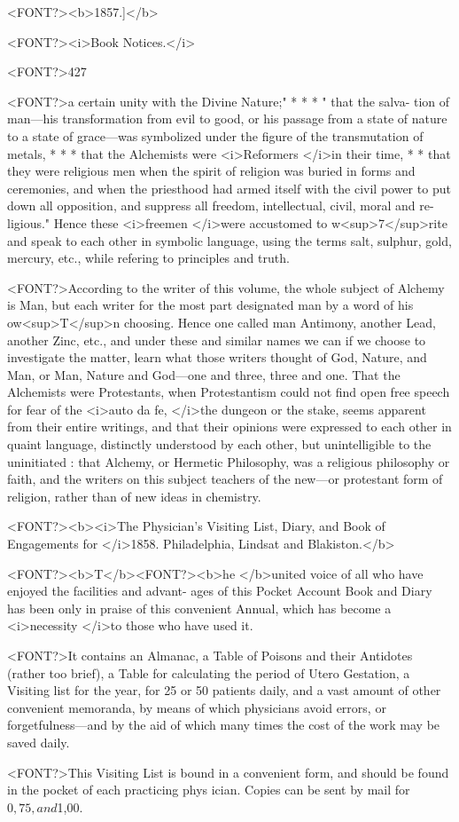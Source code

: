 <FONT?><b>1857.]</b>

<FONT?><i>Book Notices.</i>

<FONT?>427

<FONT?>a certain unity with the Divine Nature;" * * * " that the salva-
tion of man---his transformation from evil to good, or his passage from
a state of nature to a state of grace---was symbolized under the figure
of the transmutation of metals, * * * that the Alchemists were
<i>Reformers </i>in their time, * * that they were religious men when
the spirit of religion was buried in forms and ceremonies, and when
the priesthood had armed itself with the civil power to put down all
opposition, and suppress all freedom, intellectual, civil, moral and re-
ligious." Hence these <i>freemen </i>were accustomed to w<sup>7</sup>rite and speak
to each other in symbolic language, using the terms salt, sulphur, gold,
mercury, etc., while refering to principles and truth.

<FONT?>According to the writer of this volume, the whole subject of Alchemy
is Man, but each writer for the most part designated man by a word of
his ow<sup>T</sup>n choosing. Hence one called man Antimony, another Lead,
another Zinc, etc., and under these and similar names we can if we
choose to investigate the matter, learn what those writers thought of
God, Nature, and Man, or Man, Nature and God---one and three, three
and one. That the Alchemists were Protestants, when Protestantism
could not find open free speech for fear of the <i>auto da fe, </i>the dungeon
or the stake, seems apparent from their entire writings, and that their
opinions were expressed to each other in quaint language, distinctly
understood by each other, but unintelligible to the uninitiated : that
Alchemy, or Hermetic Philosophy, was a religious philosophy or faith,
and the writers on this subject teachers of the new---or protestant form
of religion, rather than of new ideas in chemistry.

<FONT?><b><i>The Physician's Visiting List, Diary, and Book of Engagements for </i>1858. Philadelphia,
Lindsat and Blakiston.</b>

<FONT?><b>T</b><FONT?><b>he </b>united voice of all who have enjoyed the facilities and advant-
ages of this Pocket Account Book and Diary has been only in praise
of this convenient Annual, which has become a <i>necessity </i>to those who
have used it.

<FONT?>It contains an Almanac, a Table of Poisons and their Antidotes
(rather too brief), a Table for calculating the period of Utero Gestation,
a Visiting list for the year, for 25 or 50 patients daily, and a vast
amount of other convenient memoranda, by means of which physicians
avoid errors, or forgetfulness---and by the aid of which many times
the cost of the work may be saved daily.

<FONT?>This Visiting List is bound in a convenient form, and should be found
in the pocket of each practicing phys ician. Copies can be sent by mail
for $0,75, and $1,00.\endinput
